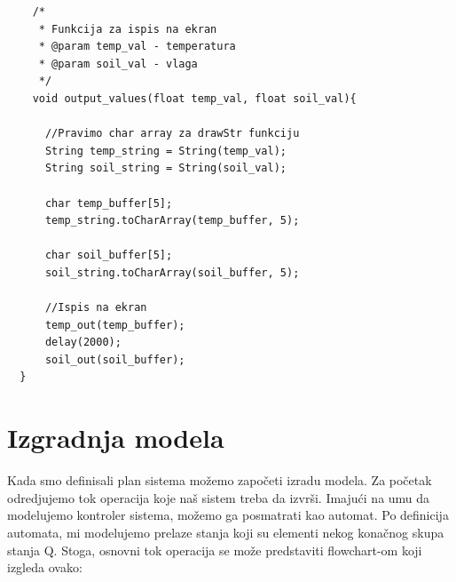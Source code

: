 \documentclass[a4paper,11pt]{book}
\begin{document}
    
  \begin{lstlisting}
    /*
     * Funkcija za ispis na ekran
     * @param temp_val - temperatura
     * @param soil_val - vlaga
     */
    void output_values(float temp_val, float soil_val){

	  //Pravimo char array za drawStr funkciju
	  String temp_string = String(temp_val);
	  String soil_string = String(soil_val);

	  char temp_buffer[5];
	  temp_string.toCharArray(temp_buffer, 5);

	  char soil_buffer[5];
	  soil_string.toCharArray(soil_buffer, 5);

	  //Ispis na ekran
	  temp_out(temp_buffer);
	  delay(2000);
	  soil_out(soil_buffer);  
  }
    \end{lstlisting}

\chapter{Izgradnja modela}

Kada smo definisali plan sistema možemo započeti izradu modela. Za početak odredjujemo tok operacija koje naš sistem treba da izvrši. Imajući na umu da modelujemo kontroler sistema, možemo ga posmatrati kao automat. Po definicija automata, mi modelujemo prelaze stanja koji su elementi nekog konačnog skupa stanja Q. Stoga, osnovni tok operacija se može predstaviti flowchart-om koji izgleda ovako:
\end{document}

